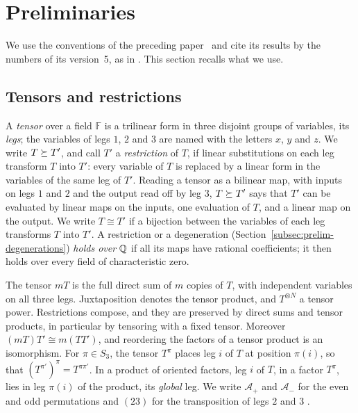 \section{Preliminaries}
\label{sec:prelim}

We use the conventions of the preceding paper~\citep{FinCon26} and cite
its results by the numbers of its version~5, as in
\citep[Lemma~2.4]{FinCon26}. This section recalls what we use.

\subsection{Tensors and restrictions}
\label{subsec:prelim-tensors}

A \emph{tensor} over a field \(\mathbb F\) is a trilinear form in three
disjoint groups of variables, its \emph{legs}; the variables of legs
\(1\), \(2\) and \(3\) are named with the letters \(x\), \(y\) and
\(z\). We write \(T\succeq T'\), and call \(T'\) a \emph{restriction} of
\(T\), if linear substitutions on each leg transform \(T\) into \(T'\):
every variable of \(T\) is replaced by a linear form in the variables of
the same leg of \(T'\). Reading a tensor as a bilinear map, with inputs on
legs \(1\) and \(2\) and the output read off by leg \(3\),
\(T\succeq T'\) says that \(T'\) can be evaluated by linear maps on the
inputs, one evaluation of \(T\), and a linear map on the output. We
write \(T\cong T'\) if a bijection between the variables of each leg
transforms \(T\) into \(T'\).
A restriction or a degeneration (Section~\ref{subsec:prelim-degenerations})
\emph{holds over \(\mathbb Q\)} if all its maps have rational coefficients; it
then holds over every field of characteristic zero.

The tensor \(mT\) is the full direct sum of \(m\) copies of \(T\), with
independent variables on all three legs. Juxtaposition denotes the tensor
product, and \(T^{\otimes N}\) a tensor power. Restrictions compose, and
they are preserved by direct sums and tensor products, in particular by
tensoring with a fixed tensor. Moreover \((mT)T'\cong m(TT')\), and
reordering the factors of a tensor product is an isomorphism. For
\(\pi\in S_3\), the tensor \(T^\pi\) places leg \(i\) of \(T\) at
position \(\pi(i)\), so that \((T^{\pi'})^\pi=T^{\pi\pi'}\). In a product
of oriented factors, leg \(i\) of \(T\), in a factor \(T^\pi\), lies in
leg \(\pi(i)\) of the product, its \emph{global} leg. We write
\(\mathcal A_+\) and \(\mathcal A_-\) for the even and odd permutations
and \((23)\) for the transposition of legs \(2\) and \(3\)
\citep[Section~2.1]{FinCon26}.

